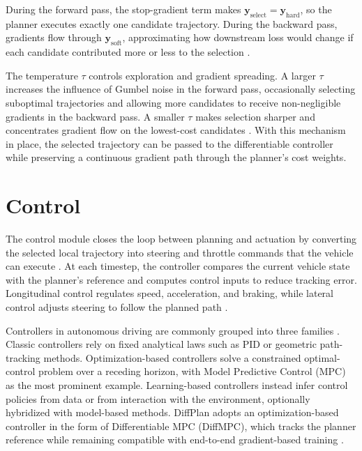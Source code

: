 During the forward pass, the stop-gradient term makes $\mathbf{y}_{\text{select}} = \mathbf{y}_{\text{hard}}$, so the planner executes exactly one candidate trajectory.
During the backward pass, gradients flow through $\mathbf{y}_{\text{soft}}$, approximating how downstream loss would change if each candidate contributed more or less to the selection \cite{koch_DifferentiableInterpretablePath_2025}.

The temperature $\tau$ controls exploration and gradient spreading.
A larger $\tau$ increases the influence of Gumbel noise in the forward pass, occasionally selecting suboptimal trajectories and allowing more candidates to receive non-negligible gradients in the backward pass.
A smaller $\tau$ makes selection sharper and concentrates gradient flow on the lowest-cost candidates \cite{koch_DifferentiableInterpretablePath_2025}.
With this mechanism in place, the selected trajectory can be passed to the differentiable controller while preserving a continuous gradient path through the planner's cost weights.

\section{Control}
\label{section:DiffPlanControl}

The control module closes the loop between planning and actuation by converting the selected local trajectory into steering and throttle commands that the vehicle can execute \cite{swadiryus_DifferentiableMotionPlanning_2025, koch_DifferentiableInterpretablePath_2025}.
At each timestep, the controller compares the current vehicle state with the planner's reference and computes control inputs to reduce tracking error.
Longitudinal control regulates speed, acceleration, and braking, while lateral control adjusts steering to follow the planned path \cite{swadiryus_DifferentiableMotionPlanning_2025}.

Controllers in autonomous driving are commonly grouped into three families \cite{ogretmen_local_2025, swadiryus_DifferentiableMotionPlanning_2025}.
Classic controllers rely on fixed analytical laws such as PID or geometric path-tracking methods.
Optimization-based controllers solve a constrained optimal-control problem over a receding horizon, with Model Predictive Control (MPC) as the most prominent example.
Learning-based controllers instead infer control policies from data or from interaction with the environment, optionally hybridized with model-based methods.
DiffPlan adopts an optimization-based controller in the form of Differentiable MPC (DiffMPC), which tracks the planner reference while remaining compatible with end-to-end gradient-based training \cite{swadiryus_DifferentiableMotionPlanning_2025, koch_DifferentiableInterpretablePath_2025, tungka_diffmpc_2024}.

